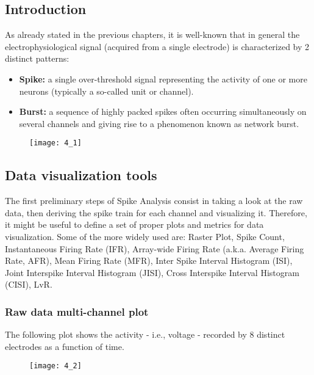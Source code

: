 \subsection{Introduction}
As already stated in the previous chapters, it is well-known that in general the electrophysiological
signal (acquired from a single electrode) is characterized by 2 distinct patterns:
\begin{itemize}
    \item \textbf{Spike:} a single over-threshold signal representing the activity of one or
          more neurons (typically a so-called unit or channel).
    \item \textbf{Burst:} a sequence of highly packed spikes often occurring simultaneously on
          several channels and giving rise to a phenomenon known as network burst.
\end{itemize}
\begin{figure}[H]
    \texttt{[image: 4\_1]}
    \centering
\end{figure}

\subsection{Data visualization tools}
The first preliminary steps of Spike Analysis consist in taking a look at the raw data, then
deriving the spike train for each channel and visualizing it. Therefore, it might be useful
to define a set of proper plots and metrics for data visualization. Some of the more widely
used are: Raster Plot, Spike Count, Instantaneous Firing Rate (IFR), Array-wide Firing Rate
(a.k.a. Average Firing Rate, AFR), Mean Firing Rate (MFR), Inter Spike Interval Histogram
(ISI), Joint Interspike Interval Histogram (JISI), Cross Interspike Interval Histogram
(CISI), LvR.
\subsubsection{Raw data multi-channel plot}
The following plot shows the activity - i.e., voltage - recorded by 8 distinct electrodes
as a function of time.
\begin{figure}[H]
    \texttt{[image: 4\_2]}
    \centering
\end{figure}
